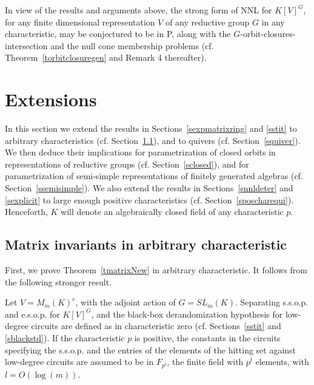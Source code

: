 \documentclass[11pt]{article}
\begin{document}
In view of the results and arguments above, 
the strong form of NNL for $K[V]^G$, for any 
finite dimensional representation $V$ of any reductive group $G$ in any characteristic,
may be conjectured to be in P, along with 
the $G$-orbit-closures-intersection and the null cone membership
problems (cf. Theorem~\ref{torbitclosuregen} and Remark 4 thereafter).


%
\section{Extensions} \label{sextensions}
In this section we extend the results in Sections~\ref{sexpmatrixring} and  \ref{sstit}
to arbitrary  characteristics (cf. Section~\ref{smatrixpos}), and to 
quivers (cf. Section~\ref{squiver}). We then
deduce their  implications for parametrization of closed orbits 
in representations of reductive groups (cf. Section~\ref{sclosed}),
and for parametrization of semi-simple representations of finitely generated
algebras (cf. Section~\ref{ssemisimple}). We also 
extend the results in Sections~\ref{snnldeter} and \ref{sexplicit} to large  enough positive characteristics
(cf. Section~\ref{sposcharequi}).
Henceforth, $K$ will denote an algebraically closed field of any characteristic $p$.

\subsection{Matrix invariants in arbitrary   characteristic} \label{smatrixpos}
First,  we  prove Theorem~\ref{tmatrixNew} in arbitrary characteristic.
It follows from the following  stronger result.

Let $V=M_m(K)^r$, with the adjoint action of $G=SL_m(K)$. 
Separating s.s.o.p. and e.s.o.p. for $K[V]^G$, and the black-box derandomization 
hypothesis for low-degree circuits are  defined as 
in characteristic zero (cf.  Sections~\ref{sstit} and  \ref{sblackstd}).
If the characteristic  $p$ is positive, 
the  constants in the circuits specifying  the s.s.o.p. 
and the entries of the elements of the hitting set against low-degree circuits 
are assumed to be in $F_{p^l}$, the finite field with $p^l$ elements, with $l=O(\log(m))$. 
\end{document}
